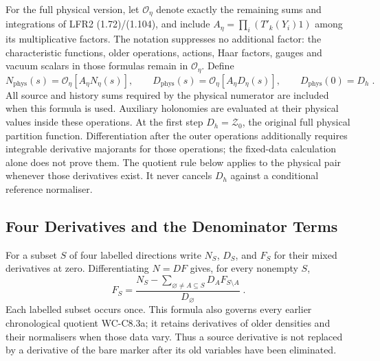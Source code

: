 \documentclass[11pt]{article}
\begin{document}
For the full physical version, let $\mathcal O_\eta$ denote exactly
the remaining sums and integrations of LFR2 (1.72)/(1.104), and include
$A_\eta=\prod_i(T'_k(Y_i)1)$ among its multiplicative factors. The
notation suppresses no additional factor: the characteristic functions,
older operations, actions, Haar factors, gauges and vacuum scalars in
those formulas remain in $\mathcal O_\eta$. Define
\begin{equation}\label{eq:c8-fourth-physical}
    N_{\mathrm{phys}}(s)=\mathcal O_\eta[A_\eta N_\eta(s)],\qquad
    D_{\mathrm{phys}}(s)=\mathcal O_\eta[A_\eta D_\eta(s)],\qquad
    D_{\mathrm{phys}}(0)=D_h\;.
\end{equation}
All source and history sums required by the physical numerator are
included when this formula is used. Auxiliary holonomies are evaluated
at their physical values inside these operations. At the first step
$D_h=\mathcal Z_0$, the original full physical partition function. Differentiation
after the outer operations additionally requires integrable derivative
majorants for those operations; the fixed-data calculation alone does
not prove them. The quotient rule below applies to the physical pair
whenever those derivatives exist. It never cancels $D_h$ against a
conditional reference normaliser.

\subsection{Four Derivatives and the Denominator Terms}

For a subset $S$ of four labelled directions write $N_S$, $D_S$, and
$F_S$ for their mixed derivatives at zero. Differentiating $N=DF$
gives, for every nonempty $S$,
\begin{equation}\label{eq:c8-fourth-quotient}
    F_S=\frac{N_S-\sum_{\varnothing\neq A\subseteq S}
        D_AF_{S\setminus A}}{D_\varnothing}\;.
\end{equation}
Each labelled subset occurs once. This formula also governs every
earlier chronological quotient WC-C8.3a; it retains derivatives of
older densities and their normalisers when those data vary. Thus a
source derivative is not replaced by a derivative of the bare marker
after its old variables have been eliminated.
\end{document}

